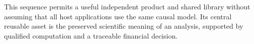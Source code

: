 This sequence permits a useful independent product and shared library
without assuming that all host applications use the same causal model.
Its central reusable asset is the preserved scientific meaning of an
analysis, supported by qualified computation and a traceable financial
decision.




